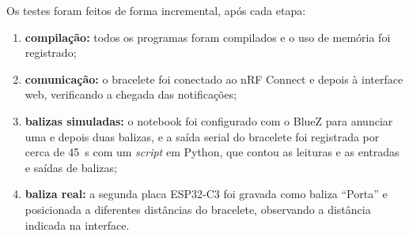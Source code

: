 Os testes foram feitos de forma incremental, após cada etapa:
\begin{enumerate}
    \item \textbf{compilação:} todos os programas foram compilados e o uso de memória foi registrado;
    \item \textbf{comunicação:} o bracelete foi conectado ao nRF Connect e depois à interface web, verificando a chegada das notificações;
    \item \textbf{balizas simuladas:} o notebook foi configurado com o BlueZ para anunciar uma e depois duas balizas, e a saída serial do bracelete foi registrada por cerca de 45~s com um \textit{script} em Python, que contou as leituras e as entradas e saídas de balizas;
    \item \textbf{baliza real:} a segunda placa ESP32-C3 foi gravada como baliza ``Porta'' e posicionada a diferentes distâncias do bracelete, observando a distância indicada na interface.
\end{enumerate}
